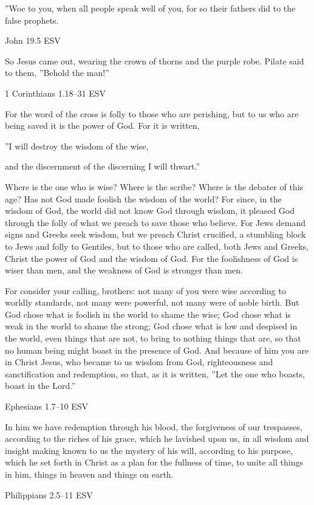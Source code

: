 \documentclass[
]{article}
\newcommand{\RL}[1]{\beginR #1\endR}
\begin{document}
\RL{''}Woe to you, when all people speak well of you, for so their
fathers did to the false prophets.

John 19.5 ESV

So Jesus came out, wearing the crown of thorns and the purple robe.
Pilate said to them, \RL{''}Behold the man!''

1 Corinthians 1.18--31 ESV

For the word of the cross is folly to those who are perishing, but to us
who are being saved it is the power of God. For it is written,

\RL{''}I will destroy the wisdom of the wise,

and the discernment of the discerning I will thwart.''

Where is the one who is wise? Where is the scribe? Where is the debater
of this age? Has not God made foolish the wisdom of the world? For
since, in the wisdom of God, the world did not know God through wisdom,
it pleased God through the folly of what we preach to save those who
believe. For Jews demand signs and Greeks seek wisdom, but we preach
Christ crucified, a stumbling block to Jews and folly to Gentiles, but
to those who are called, both Jews and Greeks, Christ the power of God
and the wisdom of God. For the foolishness of God is wiser than men, and
the weakness of God is stronger than men.

For consider your calling, brothers: not many of you were wise according
to worldly standards, not many were powerful, not many were of noble
birth. But God chose what is foolish in the world to shame the wise; God
chose what is weak in the world to shame the strong; God chose what is
low and despised in the world, even things that are not, to bring to
nothing things that are, so that no human being might boast in the
presence of God. And because of him you are in Christ Jesus, who became
to us wisdom from God, righteousness and sanctification and redemption,
so that, as it is written, \RL{''}Let the one who boasts, boast in the
Lord.''

Ephesians 1.7--10 ESV

In him we have redemption through his blood, the forgiveness of our
trespasses, according to the riches of his grace, which he lavished upon
us, in all wisdom and insight making known to us the mystery of his
will, according to his purpose, which he set forth in Christ as a plan
for the fullness of time, to unite all things in him, things in heaven
and things on earth.

Philippians 2.5--11 ESV
\end{document}
